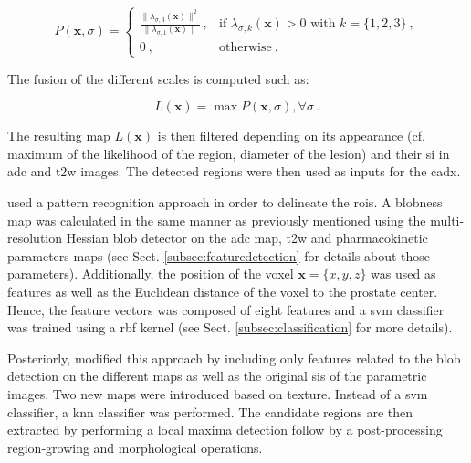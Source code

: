 \begin{equation}
P(\mathbf{x},\sigma) = \begin{cases}
	\frac{\| \lambda_{\sigma,3}(\mathbf{x}) \|^{2}}{\| \lambda_{\sigma,1} (\mathbf{x}) \|} \ , & \text{if } \lambda_{\sigma,k}(\mathbf{x}) > 0 \text{ with } k = \{1,2,3\} \  , \\
	0 \ , & \text{otherwise} \ .
\end{cases}
\label{eq:blobdet}
\end{equation}

The fusion of the different scales is computed such as:

\begin{equation}
	L(\mathbf{x}) = \max P(\mathbf{x},\sigma) , \forall \sigma \ .
	\label{eq:fusionBlob}
\end{equation}

The resulting map $L(\mathbf{x})$ is then filtered depending on its appearance (cf. maximum of the likelihood of the region, diameter of the lesion) and their \ac{si} in \ac{adc} and \ac{t2w} images. The detected regions were then used as inputs for the \ac{cadx}.

\cite{Litjens2011} used a pattern recognition approach in order to delineate the \acp{roi}. A blobness map was calculated in the same manner as previously mentioned using the multi-resolution Hessian blob detector on the \ac{adc} map, \ac{t2w} and pharmacokinetic parameters maps (see Sect. \ref{subsec:featuredetection} for details about those parameters). Additionally, the position of the voxel $\mathbf{x}=\{x,y,z\}$ was used as features as well as the Euclidean distance of the voxel to the prostate center. Hence, the feature vectors was composed of eight features and a \ac{svm} classifier was trained using a \ac{rbf} kernel (see Sect. \ref{subsec:classification} for more details).

Posteriorly, \cite{Litjens2012} modified this approach by including only features related to the blob detection on the different maps as well as the original \acp{si} of the parametric images. Two new maps were introduced based on texture. Instead of a \ac{svm} classifier, a \ac{knn} classifier was performed. The candidate regions are then extracted by performing a local maxima detection follow by a post-processing region-growing and morphological operations. 